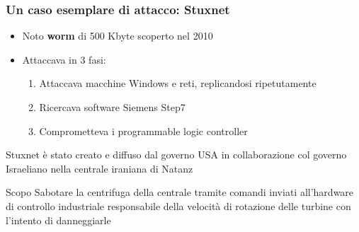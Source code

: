 
\begin{frame}
  \frametitle{Un caso esemplare di attacco: Stuxnet}
  \begin{itemize}[<+- | alert@+>]
  	\item Noto \textbf{\color{blue_slides}worm} di 500 Kbyte scoperto nel 2010 %
  	\item Attaccava in 3 fasi:
  	\begin{enumerate}[<+- | alert@+>]
  		\item Attaccava macchine Windows e reti, replicandosi ripetutamente
  		\item Ricercava software Siemens Step7 %
  		\item Comprometteva i programmable logic controller
  	\end{enumerate}
  \end{itemize}
  \pause
  \begin{block}{}
  Stuxnet è stato creato e diffuso dal governo USA in collaborazione col governo Israeliano nella centrale iraniana di Natanz
  \end{block}
  \pause
   \begin{block}{Scopo}
   	Sabotare la centrifuga della centrale tramite comandi inviati all’hardware di controllo industriale responsabile della velocità di rotazione delle turbine con l'intento di danneggiarle
   \end{block}
\end{frame}

